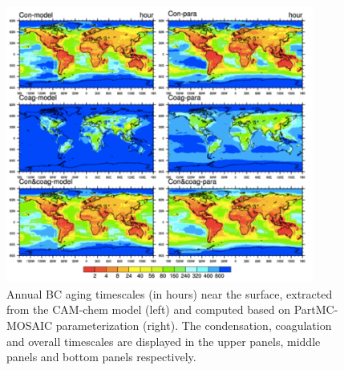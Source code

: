 \documentclass[12pt, fullpage]{uiucthesis2009}
\begin{document}
	
	\begin{figure}[h] 
		\begin{center}
			\includegraphics[width = 0.9\textwidth]{Figure32}
			\caption[Annual BC aging timescales (in hours) near the surface, extracted from the CAM-chem model (left) and computed based on PartMC-MOSAIC parameterization (right). The condensation, coagulation and overall timescales are displayed in the upper panels, middle panels and bottom panels respectively]{\label{fig_p32} Annual BC aging timescales (in hours) near the surface, extracted from the CAM-chem model (left) and computed based on PartMC-MOSAIC parameterization (right). The condensation, coagulation and overall timescales are displayed in the upper panels, middle panels and bottom panels respectively.}
		\end{center}
	\end{figure}
\end{document}
